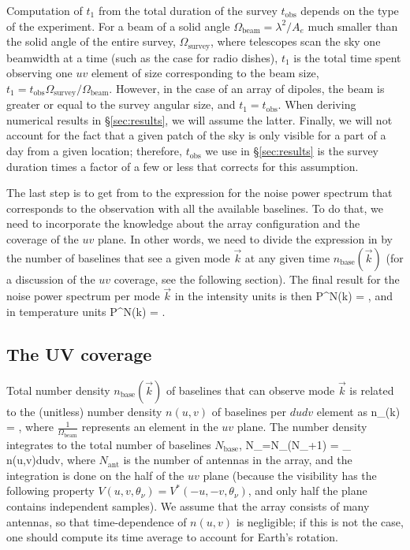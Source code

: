 Computation of $t_1$ from the total duration of the survey  $t_\text{obs}$ depends on the type of the experiment.  For a beam of a solid angle $\Omega_\text{beam}=\lambda^2/A_e$ much smaller than the solid angle of the entire survey, $\Omega_\text{survey}$, where telescopes scan the sky one beamwidth at a time (such as the case for radio dishes), $t_1$ is the total time spent observing one $uv$ element of size corresponding to the beam size, $t_1=t_\text{obs}\Omega_\text{survey}/\Omega_\text{beam}$. However, in the case of an array of dipoles, the beam is greater or equal to the survey angular size, and $t_1=t_\text{obs}$. When deriving numerical results in \S\ref{sec:results}, we will assume the latter. Finally, we will not account for the fact that a given patch of the sky is only visible for a part of a day from a given location; therefore, $t_\text{obs}$ we use in \S\ref{sec:results} is the survey duration times a factor of a few or less that corrects for this assumption.

The last step is to get from \eq{\ref{eq:Pnoise_1mode}} to the expression for the noise power spectrum that corresponds to the observation with all the available baselines. To do that, we need to incorporate the knowledge about the array configuration and the coverage of the $uv$ plane. In other words, we need to divide the expression in \eq{\ref{eq:Pnoise_1mode}} by the number of baselines that see a given mode $\vec k$ at any given time $n_\text{base}(\vec k)$ (for a discussion of the $uv$ coverage, see the following section). The final result for the noise power spectrum per mode $\vec k$ in the intensity units is then
\beq
P^N(\vec k) = ,
\label{eq:Pnoise_Jy}
\eeq
and in temperature units
\beq
P^N(\vec k) = .
\label{eq:Pnoise_K}
\eeq
\subsection{The UV coverage}
\label{subsec:uv}

Total number density $n_\text{base}(\vec k)$ of baselines that can observe mode $\vec k$ is related to the (unitless) number density $n(u,v)$ of baselines per $dudv$ element as
\beq
n_(\vec k) = ,
\label{eq:nuv_nk}
\eeq
where $\frac{1}{\Omega_\text{beam}}$ represents an element in the $uv$ plane. The number density integrates to the total number of baselines $N_\text{base}$,
\beq
N_=N_(N_+1) = \int_ n(u,v)dudv,
\label{eq:nk}
\eeq
where $N_\text{ant}$ is the number of antennas in the array, and the integration is done on the half of the $uv$ plane (because the visibility has the following property $V(u,v,\theta_\nu)=V^*(-u,-v,\theta_\nu)$, and only half the plane contains independent samples). We assume that the array consists of many antennas, so that time-dependence of $n(u,v)$ is negligible; if this is not the case, one should compute its time average to account for Earth's rotation.

